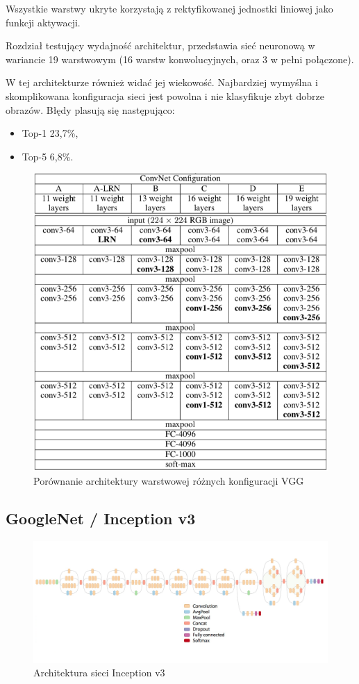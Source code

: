 \documentclass[12pt,a4paper,twoside,titlepage,openright]{book}
\begin{document}
Wszystkie warstwy ukryte korzystają z rektyfikowanej jednostki liniowej jako funkcji aktywacji.

Rozdział testujący wydajność architektur, przedstawia sieć neuronową w wariancie 19 warstwowym (16 warstw konwolucyjnych, oraz 3 w pełni połączone).

W tej architekturze również widać jej wiekowość. Najbardziej wymyślna i skomplikowana konfiguracja sieci jest powolna i nie klasyfikuje zbyt dobrze obrazów. Błędy plasują się następująco:
\begin{itemize}
\item Top-1 23,7\%,
\item Top-5 6,8\%.
\end{itemize}
\cite{DBLP:journals/corr/SimonyanZ14a}

\begin{figure}[ht]
	\centering
			\includegraphics[resolution=100, scale=0.8]{vggArchComparison.png}
		\caption{Porównanie architektury warstwowej różnych konfiguracji VGG}
\end{figure}


\subsection{GoogleNet / Inception v3}
\begin{figure}[h]
	\centering
			\includegraphics[resolution=100, scale=0.36]{inceptionv3architecture.png}
		\caption{Architektura sieci Inception v3}
\end{figure}
\end{document}

